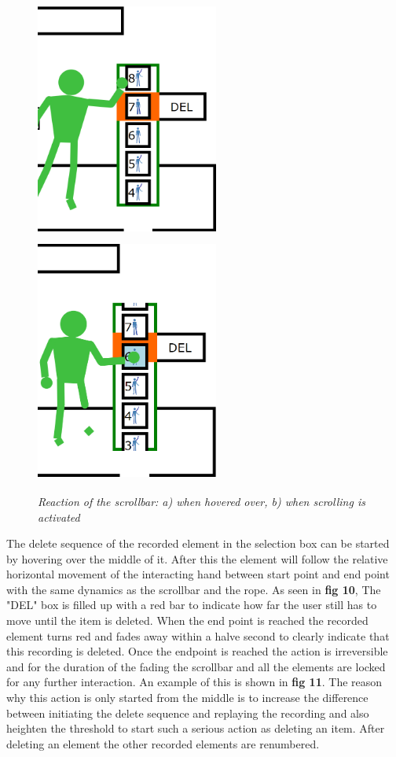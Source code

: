 \begin{figure}[H]
	\begin{center}
		\includegraphics[width=6cm, height=8cm]{figures/9_hover_scrollbar.png}
		\includegraphics[width=6cm, height=8cm]{figures/10_scroll_scrollbar.png}
		\caption{\emph{Reaction of the scrollbar: a) when hovered over, b) when scrolling is activated}}
		\label{The regular view of the end desing of the UI}
	\end{center}
\end{figure}

The delete sequence of the recorded element in the selection box can be started by hovering over the middle of it. After this the element will follow the relative horizontal movement of the interacting hand between start point and end point with the same dynamics as the scrollbar and the rope. As seen in \textbf{ fig 10}, The "DEL" box is filled up with a red bar to indicate how far the user still has to move until the item is deleted. When the end point is reached the recorded element turns red and fades away within a halve second to clearly indicate that this recording is deleted. Once the endpoint is reached the action is irreversible and for the duration of the fading the scrollbar and all the elements are locked for any further interaction. An example of this is shown in \textbf{ fig 11}. The reason why this action is only started from the middle is to increase the difference between initiating the delete sequence and replaying the recording and also heighten the threshold to start such a serious action as deleting an item. After deleting an element the other recorded elements are renumbered.

